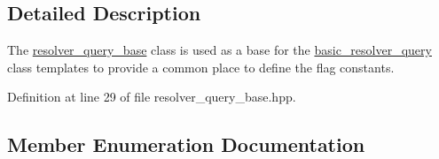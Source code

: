 \subsection{Detailed Description}
The \hyperlink{classasio_1_1ip_1_1resolver__query__base}{resolver\+\_\+query\+\_\+base} class is used as a base for the \hyperlink{classasio_1_1ip_1_1basic__resolver__query}{basic\+\_\+resolver\+\_\+query} class templates to provide a common place to define the flag constants. 

Definition at line 29 of file resolver\+\_\+query\+\_\+base.\+hpp.



\subsection{Member Enumeration Documentation}
\hypertarget{classasio_1_1ip_1_1resolver__query__base_a458691242de07dc542fd9834f7b15cfe}{}
